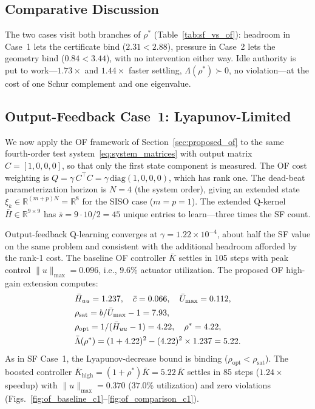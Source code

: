\documentclass[final,5p,times,authoryear]{elsarticle}
\theoremstyle{plain}
\theoremstyle{definition}
\theoremstyle{remark}
\begin{document}
\subsection{Comparative Discussion}

The two cases visit both branches of $\rho^{*}$
(Table~\ref{tab:sf_vs_of}): headroom in Case~1 lets the certificate
bind ($2.31 < 2.88$), pressure in Case~2 lets the geometry bind
($0.84 < 3.44$), with no intervention either way.  Idle authority is
put to work---$1.73\times$ and $1.44\times$ faster settling,
$\Lambda(\rho^*)\succ 0$, no violation---at the cost of one Schur
complement and one eigenvalue.


\subsection{Output-Feedback Case~1: Lyapunov-Limited}
\label{sec:of_results_c1}

We now apply the OF framework of Section~\ref{sec:proposed_of} to the
same fourth-order test system~\eqref{eq:system_matrices} with output
matrix $C = [1, 0, 0, 0]$, so that only the first state component is
measured.  The OF cost weighting is
$Q = \gamma\,C^{\!\top}\!C = \gamma\,\mathrm{diag}(1, 0, 0, 0)$, which
has rank one.  The dead-beat parameterization horizon is $N = 4$
(the system order), giving an extended state
$\xi_k \in \mathbb{R}^{(m + p)N} = \mathbb{R}^{8}$ for the SISO case ($m = p = 1$).
The extended Q-kernel
$\bar H \in \mathbb{R}^{9 \times 9}$ has $\bar s = 9 \cdot 10 / 2 = 45$ unique
entries to learn---three times the SF count.

Output-feedback Q-learning {\citep[Algorithm~2.1]{RizviLin2023book}}
converges at $\gamma = 1.22 \times 10^{-4}$, about half the SF value
on the same problem and consistent with the additional headroom
afforded by the rank-1 cost.  The baseline OF controller $\bar K$
settles in 105 steps with peak control $\|u\|_{\max} = 0.096$, i.e.,
$9.6\%$ actuator utilization.  The proposed OF high-gain extension
computes:
\begin{align}
&\bar H_{uu} = 1.237, \quad \bar c = 0.066, \quad \bar U_{\max} = 0.112, \notag\\
&\rho_{\mathrm{sat}} = b/\bar U_{\max} - 1 = 7.93, \notag\\
&\rho_{\mathrm{opt}} = 1/(\bar H_{uu} - 1) = 4.22, \quad \rho^{*} = 4.22, \notag\\
&\bar\Lambda(\rho^{*}) = (1 + 4.22)^2 - (4.22)^2 \times 1.237 = 5.22.
\end{align}
As in SF Case~1, the Lyapunov-decrease bound is binding
($\rho_{\mathrm{opt}} < \rho_{\mathrm{sat}}$).  The boosted controller
$\bar K_{\mathrm{high}} = (1+\rho^{*})\bar K = 5.22\,\bar K$ settles in
85 steps
($1.24\times$ speedup) with $\|u\|_{\max} = 0.370$ ($37.0\%$
utilization) and zero violations
(Figs.~\ref{fig:of_baseline_c1}--\ref{fig:of_comparison_c1}).
\end{document}
